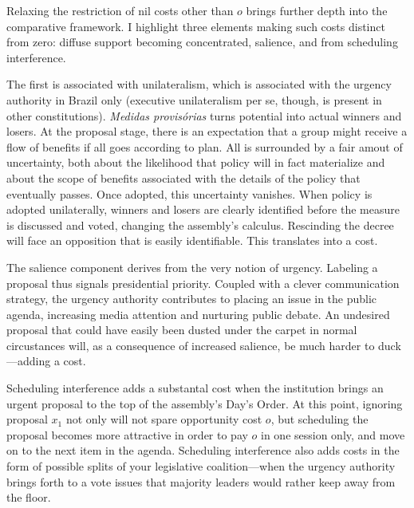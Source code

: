 \documentclass[letter,12pt]{article}
\begin{document}
Relaxing the restriction of nil costs other than $o$ brings further depth into the comparative framework. I highlight three elements making such costs distinct from zero: diffuse support becoming concentrated, salience, and from scheduling interference.

The first is associated with unilateralism, which is associated with the urgency authority in Brazil only (executive unilateralism per se, though, is present in other constitutions). \emph{Medidas provis\'orias} turns potential into actual winners and losers. At the proposal stage, there is an expectation that a group might receive a flow of benefits if all goes according to plan. All is surrounded by a fair amout of uncertainty, both about the likelihood that policy will in fact materialize and about the scope of benefits associated with the details of the policy that eventually passes. Once adopted, this uncertainty vanishes. When policy is adopted unilaterally, winners and losers are clearly identified before the measure is discussed and voted, changing the assembly's calculus. Rescinding the decree will face an opposition that is easily identifiable. This translates into a cost.  

The salience component derives from the very notion of urgency. Labeling a proposal thus signals presidential priority. Coupled with a clever communication strategy, the urgency authority contributes to placing an issue in the public agenda, increasing media attention and nurturing public debate. An undesired proposal that could have easily been dusted under the carpet in normal circustances will, as a consequence of increased salience, be much harder to duck---adding a cost. 

Scheduling interference adds a substantal cost when the institution brings an urgent proposal to the top of the assembly's Day's Order. At this point, ignoring proposal $x_1$ not only will not spare opportunity cost $o$, but scheduling the proposal becomes more attractive in order to pay $o$ in one session only, and move on to the next item in the agenda. Scheduling interference also adds costs in the form of possible splits of your legislative coalition---when the urgency authority brings forth to a vote issues that majority leaders would rather keep away from the floor. 
\end{document}
